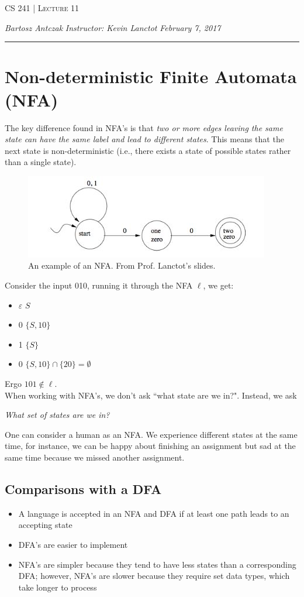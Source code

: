 \documentclass{report}
\newcommand{\lectureNum}{11}
\newcommand{\curDate}{February 7, 2017}
\newcommand{\course}{CS 241}
\newcommand{\instructor}{Kevin Lanctot}
\begin{document}
\begin{center}
\begin{Large}
\textsc{\course{} | Lecture \lectureNum{}}
\end{Large}
\end{center} 
\noindent \textit{Bartosz Antczak} \hfill
\textit{Instructor: \instructor{}} \hfill
\textit{\curDate{}}
\rule{\textwidth}{0.4pt}
\section{Non-deterministic Finite Automata (NFA)}
The key difference found in NFA's is that \textit{two or more edges leaving the same state can have the same label and lead to different states}. This means that the next state is non-deterministic (i.e., there exists a state of possible states rather than a single state).
\begin{figure}[ht]
\begin{center}
\includegraphics[scale=1]{nfa.jpg}
\end{center}
\caption{An example of an NFA. From Prof. Lanctot's slides.}
\end{figure}
Consider the input 010, running it through the NFA $\ell$, we get:
\begin{itemize}
\item $\varepsilon$ $S$
\item 0 $\{S, 10\}$
\item 1 $\{S\}$
\item 0 $\{S, 10\} \cap \{20\} = \emptyset$
\end{itemize}
Ergo $101 \not\in \ell$.\\
When working with NFA's, we don't ask ``what state are we in?". Instead, we ask
\begin{center}
\textit{What set of states are we in?}
\end{center}
One can consider a human as an NFA. We experience different states at the same time, for instance, we can be happy about finishing an assignment but sad at the same time because we missed another assignment.\\
\subsection{Comparisons with a DFA}
\begin{itemize}
\item A language is accepted in an NFA and DFA if at least one path leads to an accepting state
\item DFA's are easier to implement
\item NFA's are simpler because they tend to have less states than a corresponding DFA; however, NFA's are slower because they require set data types, which take longer to process
\end{itemize}
\end{document}
